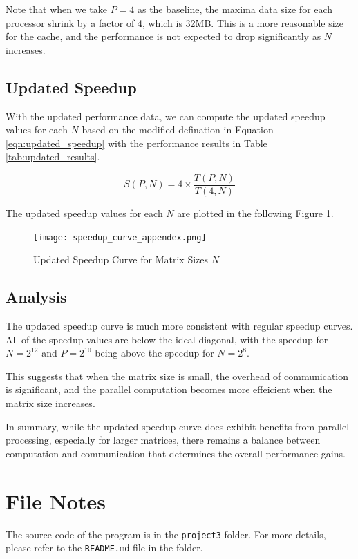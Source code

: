 \documentclass[12pt,a4paper]{article}
\begin{document}
Note that when we take \( P = 4 \) as the baseline, 
 the maxima data size for each processor shrink by a factor of 4, which is 32MB.
This is a more reasonable size for the cache, 
 and the performance is not expected to drop significantly as \( N \) increases.

\subsection{Updated Speedup}

With the updated performance data, we can compute the updated speedup values for each \( N \) 
based on the modified defination in Equation \ref{eqn:updated_speedup} with the performance results in Table \ref{tab:updated_results}.

\begin{equation}
    \label{eqn:updated_speedup}
    S(P, N) = 4 \times \frac{T(P,N)}{T(4, N)}
\end{equation}

The updated speedup values for each \( N \) are plotted in the following Figure \ref{fig:updated_speedup_curve}.

\begin{figure}[ht]
    \centering
    \texttt{[image: speedup\_curve\_appendex.png]}
    \caption{Updated Speedup Curve for Matrix Sizes \( N \)}
    \label{fig:updated_speedup_curve}
\end{figure}


\subsection{Analysis}
The updated speedup curve is much more consistent with regular speedup curves. 
All of the speedup values are below the ideal diagonal, with the speedup for \( N = 2^{12} \) and \( P = 2^{10} \)
 being above the speedup for \( N = 2^{8} \).

This suggests that when the matrix size is small, 
 the overhead of communication is significant, and the parallel computation becomes more effeicient 
 when the matrix size increases.

 In summary, while the updated speedup curve does exhibit benefits from parallel processing, 
  especially for larger matrices, 
  there remains a balance between computation and communication that 
  determines the overall performance gains.

\section*{File Notes}
The source code of the program is in the \texttt{project3} folder. 
For more details, please refer to the \texttt{README.md} file in the folder.
\end{document}
